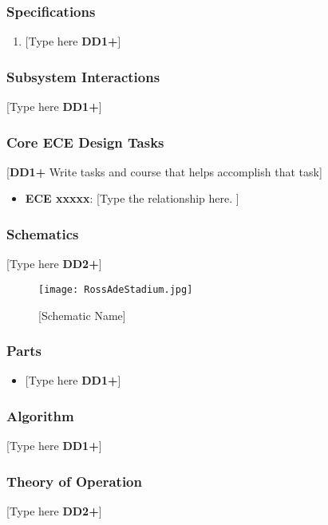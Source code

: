 \documentclass[letterpaper, 11pt]{article}
\begin{document}
\subsubsection{Specifications}
\begin{enumerate}
    \item {[Type here \textbf{DD1+}]}
\end{enumerate}

\subsubsection{Subsystem Interactions}
[Type here \textbf{DD1+}]

\subsubsection{Core ECE Design Tasks}
[\textbf{DD1+} Write tasks and course that helps accomplish that task]
\begin{itemize}
    \item \textbf{ECE xxxxx}: [Type the relationship here. ]
\end{itemize}

\subsubsection{Schematics}
[Type here \textbf{DD2+}]
\begin{figure}[h]
    \centering
    \texttt{[image: RossAdeStadium.jpg]} %
    \caption{[Schematic Name]}
\end{figure} %

\subsubsection{Parts}
\begin{itemize}
    \item {[Type here \textbf{DD1+}]}
\end{itemize}

\subsubsection{Algorithm}
[Type here \textbf{DD1+}]

\subsubsection{Theory of Operation}
[Type here \textbf{DD2+}]
\end{document}
